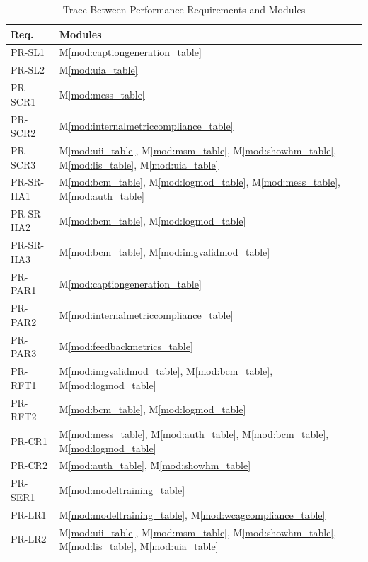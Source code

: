 \documentclass[12pt, titlepage]{article}
\newcommand{\mref}[1]{M\ref{#1}}
\begin{document}
\begin{table}[H]
  \caption{Trace Between Performance Requirements and Modules}
  \label{TblPRT}
  \centering
  \small
  \begin{tabularx}{\textwidth}{>{\RaggedRight\arraybackslash}p{}Y}
    \toprule
    \textbf{Req.} & \textbf{Modules}\\
    \midrule
    PR-SL1 & \mref{mod:captiongeneration_table}\\
    PR-SL2 &  \mref{mod:uia_table} \\
    PR-SCR1 & \mref{mod:mess_table}\\
    PR-SCR2 & \mref{mod:internalmetriccompliance_table}\\
    PR-SCR3 & \mref{mod:uii_table}, \mref{mod:msm_table},
    \mref{mod:showhm_table}, \mref{mod:lis_table}, \mref{mod:uia_table}\\
    PR-SR-HA1 & \mref{mod:bcm_table}, \mref{mod:logmod_table},
    \mref{mod:mess_table}, \mref{mod:auth_table}\\
    PR-SR-HA2 &  \mref{mod:bcm_table}, \mref{mod:logmod_table}\\
    PR-SR-HA3 &  \mref{mod:bcm_table}, \mref{mod:imgvalidmod_table}\\
    PR-PAR1 & \mref{mod:captiongeneration_table}\\
    PR-PAR2 & \mref{mod:internalmetriccompliance_table}\\
    PR-PAR3 & \mref{mod:feedbackmetrics_table}\\
    PR-RFT1 & \mref{mod:imgvalidmod_table}, \mref{mod:bcm_table},
    \mref{mod:logmod_table}\\
    PR-RFT2 & \mref{mod:bcm_table}, \mref{mod:logmod_table}\\
    PR-CR1 & \mref{mod:mess_table}, \mref{mod:auth_table},
    \mref{mod:bcm_table}, \mref{mod:logmod_table}\\
    PR-CR2 & \mref{mod:auth_table}, \mref{mod:showhm_table}\\
    PR-SER1 & \mref{mod:modeltraining_table}\\
    PR-LR1 & \mref{mod:modeltraining_table}, \mref{mod:wcagcompliance_table}\\
    PR-LR2 & \mref{mod:uii_table}, \mref{mod:msm_table},
    \mref{mod:showhm_table}, \mref{mod:lis_table}, \mref{mod:uia_table}\\
    \bottomrule
  \end{tabularx}
\end{table}
\end{document}
